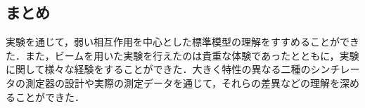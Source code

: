 \subsection{まとめ}
実験を通じて，弱い相互作用を中心とした標準模型の理解をすすめることができた．また，ビームを用いた実験を行えたのは貴重な体験であったとともに，実験に関して様々な経験をすることができた．大きく特性の異なる二種のシンチレータの測定器の設計や実際の測定データを通じて，それらの差異などの理解を深めることができた．
